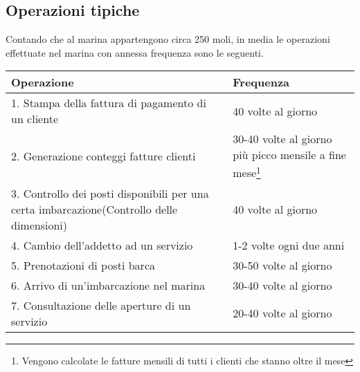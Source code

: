 \subsection{Operazioni tipiche}
Contando che al marina appartengono circa 250 moli, in media le operazioni effettuate nel marina con annessa frequenza sono le seguenti.
\begin{center}
    \begin{tabularx}{\textwidth}{|p{90mm}|X|}
        \hline
        \rowcolor{gray!30}
        \textbf{Operazione} & \textbf{Frequenza}\\
        \hline
        1. Stampa della fattura di pagamento di un cliente & 40 volte al giorno\\

        \hline
        2. Generazione conteggi fatture clienti & 30-40 volte al giorno più picco mensile a fine mese\footnote{Vengono calcolate le fatture mensili di tutti i clienti che stanno oltre il mese}\\

        \hline
        3. Controllo dei posti disponibili per una certa imbarcazione(Controllo delle dimensioni)& 40 volte al giorno\\

        \hline
        4. Cambio dell'addetto ad un servizio & 1-2 volte ogni due anni\\

        \hline
        5. Prenotazioni di posti barca & 30-50 volte al giorno\\

        \hline
        6. Arrivo di un'imbarcazione nel marina & 30-40 volte al giorno\\

        \hline
        7. Consultazione delle aperture di un servizio & 20-40 volte al giorno\\

        \hline
    \end{tabularx}
\end{center}
